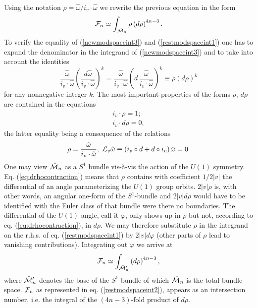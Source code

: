 \documentclass[a4paper,12pt]{article}
\begin{document}
Using the notation $\rho =\hat{\omega}/i_v \cdot \hat{\omega}$ 
we rewrite the previous equation in the form 
\begin{equation}
{\cal F}_n \simeq \int_{\hat{{\cal M}}_n} \rho \left(d\rho \right)^{4n-3}.
\label{restmodspaceint1}
\end{equation}  
To verify the equality of (\ref{newmodspaceint3}) and 
(\ref{restmodspaceint1}) one has to expand the denominator in the 
integrand of (\ref{newmodspaceint3}) and to take into account the 
identities 
\begin{equation}
\frac{\hat{\omega}}{i_v \cdot \hat{\omega}} 
\left(\frac{d\hat{\omega}}{i_v \cdot \hat{\omega}} \right)^k =
\frac{\hat{\omega}}{i_v \cdot \hat{\omega}} 
\left(d\, \frac{\hat{\omega}}{i_v \cdot \hat{\omega}} \right)^k \equiv 
\rho \left(d\rho \right)^k 
\end{equation} 
for any nonnegative integer $k$. 
The most important properties of the forms $\rho$, $d\rho$ are contained 
in the equations 
\begin{eqnarray}
\label{eq:rhocontraction}
i_v \cdot \rho =1; \\
\label{eq:drhocontraction}
i_v \cdot d\rho =0,
\end{eqnarray}
the latter equality being a consequence of the relations 
\begin{equation}
\rho=\frac{\hat{\omega}}{i_v \cdot \hat{\omega}}, \,\, 
{\cal L}_v \hat{\omega}\equiv \left(i_v \circ d + 
d \circ i_v \right) \hat{\omega}=0.
\end{equation}
One may view $\hat{{\cal M}}_n$ as a $S^1$ bundle vis-\`{a}-vis 
the action of the $U(1)$ symmetry. Eq. (\ref{eq:drhocontraction}) means 
that $\rho$ contains with coefficient $1/2|v|$ the differential of an 
angle parameterizing the $U(1)$ group orbits. $2|v|\rho$ is, with other words, 
an angular one-form of the $S^1$-bundle and $2|v|d\rho$ 
would have to be identified with the Euler class of that bundle were there 
no boundaries. The differential of the $U(1)$ angle, call it $\varphi$, 
only shows up in $\rho$ but not, according to eq. 
(\ref{eq:drhocontraction}), in $d\rho$. We may therefore substitute
$\rho$ in the integrand on the r.h.s. of eq. 
(\ref{restmodspaceint1}) by $2|v|d\varphi$ (other parts of $\rho$ lead to
vanishing contributions). Integrating out $\varphi$ we arrive at 
\begin{equation}
{\cal F}_n \simeq \int_{\hat{{\cal M}}'_n} \left(d\rho \right)^{4n-3}, 
\label{restmodspaceint2}
\end{equation}       
where $\hat{{\cal M}}'_n$ denotes the base 
of the $S^1$-bundle of which $\hat{{\cal M}}_n$ is the total bundle 
space. ${\cal F}_n$ as represented in eq. (\ref{restmodspaceint2}), 
appears as an intersection number, i.e. the integral of the 
$(4n-3)$-fold product of $d\rho$.
\end{document}
